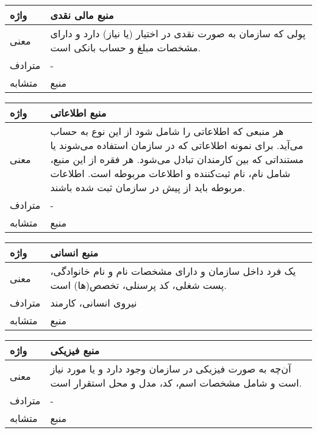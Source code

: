 \begin{table}[H]
	\centering
	\begin{tabular}{| p{1.5cm} | p{5cm} |}
		\hline
		واژه & منبع مالی نقدی \\
		\hline
		معنی  & پولی که سازمان به صورت نقدی در اختیار (یا نیاز) دارد و دارای مشخصات مبلغ و حساب بانکی است. \\
		\hline
		مترادف & - \\
		\hline
		متشابه  & منبع \\
		\hline
	\end{tabular}
\end{table}

\begin{table}[H]
	\centering
	\begin{tabular}{| p{1.5cm} | p{5cm} |}
		\hline
		واژه & منبع اطلاعاتی \\
		\hline
		معنی  & هر منبعی که اطلاعاتی را شامل شود از این نوع به حساب می‌آید. برای نمونه اطلاعاتی که در سازمان استفاده می‌شوند یا مستنداتی که بین کارمندان تبادل می‌شود. هر فقره از این منبع، شامل نام، نام ثبت‌کننده و اطلاعات مربوطه است. اطلاعات مربوطه باید از پیش در سازمان ثبت شده باشند. \\
		\hline
		مترادف & - \\
		\hline
		متشابه  & منبع \\
		\hline
	\end{tabular}
\end{table}

\begin{table}[H]
	\centering
	\begin{tabular}{| p{1.5cm} | p{5cm} |}
		\hline
		واژه & منبع انسانی \\
		\hline
		معنی  & یک فرد داخل سازمان و دارای مشخصات نام و نام خانوادگی، پست شغلی، کد پرسنلی، تخصص(ها) است. \\
		\hline
		مترادف & نیروی انسانی، کارمند \\
		\hline
		متشابه  & منبع \\
		\hline
	\end{tabular}
\end{table}

\begin{table}[H]
	\centering
	\begin{tabular}{| p{1.5cm} | p{5cm} |}
		\hline
		واژه & منبع فیزیکی \\
		\hline
		معنی  & آن‌چه به صورت فیزیکی در سازمان وجود دارد و یا مورد نیاز است و شامل مشخصات اسم، کد، مدل و محل استقرار است. \\
		\hline
		مترادف & - \\
		\hline
		متشابه  & منبع \\
		\hline
	\end{tabular}
\end{table}

